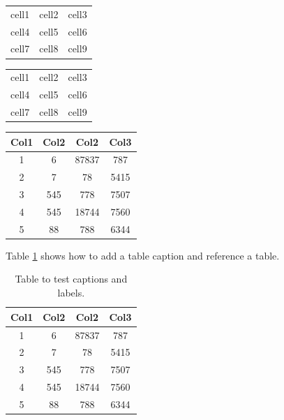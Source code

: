 \documentclass[12pt, letterpaper]{article}
\begin{document}
\begin{center}

\begin{tabular}{c c c}
 cell1 & cell2 & cell3 \\ 
 cell4 & cell5 & cell6 \\  
 cell7 & cell8 & cell9    
\end{tabular}
\end{center}

\begin{center}
\begin{tabular}{|c|c|c|} 
 \hline
 cell1 & cell2 & cell3 \\ 
 cell4 & cell5 & cell6 \\ 
 cell7 & cell8 & cell9 \\ 
 \hline
\end{tabular}
\end{center}

\begin{center}
 \begin{tabular}{||c c c c||} 
 \hline
 Col1 & Col2 & Col2 & Col3 \\ [0.5ex] 
 \hline\hline
 1 & 6 & 87837 & 787 \\ 
 \hline
 2 & 7 & 78 & 5415 \\
 \hline
 3 & 545 & 778 & 7507 \\
 \hline
 4 & 545 & 18744 & 7560 \\
 \hline
 5 & 88 & 788 & 6344 \\ [1ex] 
 \hline
\end{tabular}
\end{center}

Table \ref{table:data} shows how to add a table caption and reference a table.
\begin{table}[h!]
\centering
\begin{tabular}{||c c c c||} 
 \hline
 Col1 & Col2 & Col2 & Col3 \\ [0.5ex]
 \hline\hline
 1 & 6 & 87837 & 787 \\ 
 2 & 7 & 78 & 5415 \\
 3 & 545 & 778 & 7507 \\
 4 & 545 & 18744 & 7560 \\
 5 & 88 & 788 & 6344 \\ [1ex] 
 \hline
\end{tabular}
\caption{Table to test captions and labels.}
\label{table:data}
\end{table}
\end{document}
